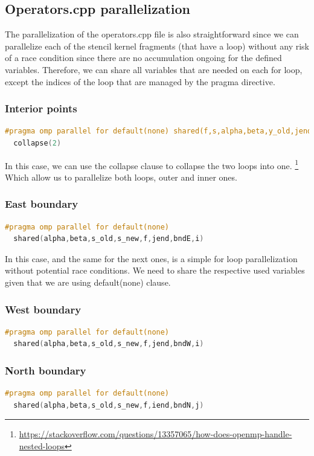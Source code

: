 \documentclass[unicode,11pt,a4paper,oneside,numbers=endperiod,openany]{scrartcl}
\begin{document}
\subsection{Operators.cpp parallelization}
The parallelization of the operators.cpp file is also straightforward since we can parallelize each of the 
stencil kernel fragments (that have a loop) without any risk of a race condition since there are no accumulation 
ongoing for the defined variables. 
Therefore, we can share all variables that are needed on each for loop, except the indices of the 
loop that are managed by the pragma directive.
\subsubsection{Interior points}
\begin{lstlisting}[language=C]
  #pragma omp parallel for default(none) shared(f,s,alpha,beta,y_old,jend,iend) 
  collapse(2)
\end{lstlisting}
In this case, we can use the collapse clause to collapse the two loops into one. \footnote{\url{https://stackoverflow.com/questions/13357065/how-does-openmp-handle-nested-loops}}
Which allow us to parallelize both loops, outer and inner ones.

\subsubsection{East boundary}
\begin{lstlisting}[language=C]
  #pragma omp parallel for default(none) 
  shared(alpha,beta,s_old,s_new,f,jend,bndE,i)
\end{lstlisting}
In this case, and the same for the next ones, is a simple for loop parallelization without
potential race conditions. We need to share the respective used variables given that we are using
default(none) clause.
\subsubsection{West boundary}
\begin{lstlisting}[language=C]
  #pragma omp parallel for default(none) 
  shared(alpha,beta,s_old,s_new,f,jend,bndW,i)
\end{lstlisting}
\subsubsection{North boundary}
\begin{lstlisting}[language=C]
  #pragma omp parallel for default(none) 
  shared(alpha,beta,s_old,s_new,f,iend,bndN,j)
\end{lstlisting}
\end{document}
